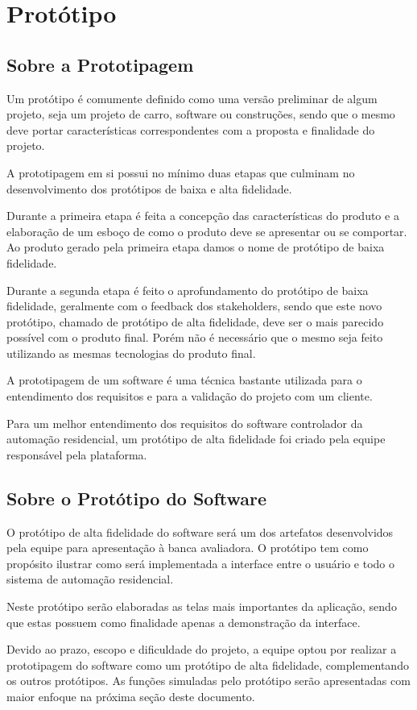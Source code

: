 \chapter{Protótipo}

\section{Sobre a Prototipagem}
\par Um protótipo é comumente definido como uma versão preliminar de algum projeto, seja um projeto de carro, software ou construções, sendo que o mesmo deve portar características correspondentes com a proposta e finalidade do projeto.
\par A prototipagem em si possui no mínimo duas etapas que culminam no desenvolvimento dos protótipos de baixa e alta fidelidade.
\par Durante a primeira etapa é feita a concepção das características do produto e a elaboração de um esboço de como o produto deve se apresentar ou se comportar. Ao produto gerado pela primeira etapa damos o nome de protótipo de baixa fidelidade.
\par Durante a segunda etapa é feito o aprofundamento do protótipo de baixa fidelidade, geralmente com o feedback dos stakeholders, sendo que este novo protótipo, chamado de protótipo de alta fidelidade, deve ser o mais parecido possível com o produto final. Porém não é necessário que o mesmo seja feito utilizando as mesmas tecnologias do produto final.
\par A prototipagem de um software é uma técnica bastante utilizada para o entendimento dos requisitos e para a validação do projeto com um cliente.
\par Para um melhor entendimento dos requisitos do software controlador da automação residencial, um protótipo de alta fidelidade foi criado pela equipe responsável pela plataforma.

\section{Sobre o Protótipo do Software}
\par O protótipo de alta fidelidade do software será um dos artefatos desenvolvidos pela equipe para apresentação à banca avaliadora. O protótipo tem como propósito ilustrar como será implementada a interface entre o usuário e todo o sistema de automação residencial.
\par Neste protótipo serão elaboradas as telas mais importantes da aplicação, sendo que estas possuem como finalidade apenas a demonstração da interface.
\par Devido ao prazo, escopo e dificuldade do projeto, a equipe optou por realizar a prototipagem do software como um protótipo de alta fidelidade, complementando os outros protótipos. As funções simuladas pelo protótipo serão apresentadas com maior enfoque na próxima seção deste documento.

